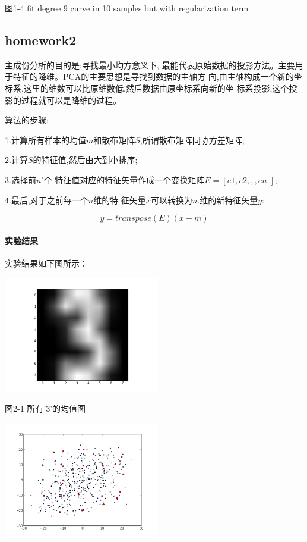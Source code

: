 \documentclass[10pt,a4paper]{article}
\theoremstyle{mythm}%
\numberwithin{equation}{section}
\begin{document}
图1-4 fit degree 9 curve in 10 samples but with regularization term

\subsection{homework2}
主成份分析的目的是:寻找最小均方意义下, 最能代表原始数据的投影方法。主要用于特征的降维。PCA的主要思想是寻找到数据的主轴方 向,由主轴构成一个新的坐标系,这里的维数可以比原维数低,然后数据由原坐标系向新的坐 标系投影,这个投影的过程就可以是降维的过程。

算法的步骤:

1.计算所有样本的均值$m$和散布矩阵$S$,所谓散布矩阵同协方差矩阵;

2.计算$S$的特征值,然后由大到小排序;

3.选择前$n′$个 特征值对应的特征矢量作成一个变换矩阵$E = [e1, e2, ,, en.]$;

4.最后,对于之前每一个$n$维的特 征矢量$x$可以转换为$n$.维的新特征矢量$y$:

$$y=transpose(E)(x-m)$$

 \paragraph{实验结果}实验结果如下图所示：
 
 \includegraphics[height=2in]{figure2-1.png} 
 
 图2-1  所有’3’的均值图
 
 \includegraphics[height=2in]{figure2-2.png} 
 
\end{document}
